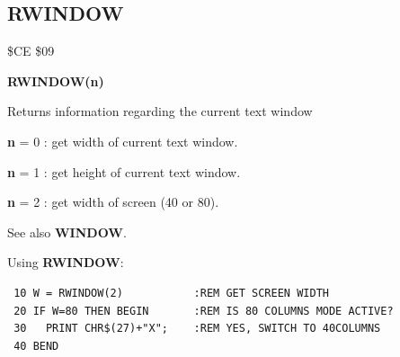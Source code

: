 \subsection{RWINDOW}
\begin{description}[leftmargin=2cm,style=nextline]
\item [Token:] \$CE \$09
\item [Format:] {\bf RWINDOW(n)}
\item [Usage:]  Returns information regarding the current text window

                {\bf n} = 0 : get width of current text window.

                {\bf n} = 1 : get height of current text window.

                {\bf n} = 2 : get width of screen (40 or 80).

\item [Remarks:] See also {\bf WINDOW}.

\item [Example:] Using {\bf RWINDOW}:
\begin{tcolorbox}[colback=black,coltext=white]
\verbatimfont{\codefont}
\begin{verbatim}
 10 W = RWINDOW(2)           :REM GET SCREEN WIDTH
 20 IF W=80 THEN BEGIN       :REM IS 80 COLUMNS MODE ACTIVE?
 30   PRINT CHR$(27)+"X";    :REM YES, SWITCH TO 40COLUMNS
 40 BEND
\end{verbatim}
\end{tcolorbox}
\end{description}





\newpage
